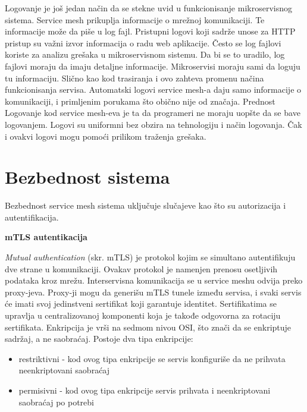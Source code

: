 \documentclass[a4paper,12pt]{report}
\begin{document}
Logovanje je još jedan način da se stekne uvid u funkcionisanje mikroservisnog sistema. Service mesh prikuplja informacije o mrežnoj komunikaciji. Te informacije može da piše u log fajl. Pristupni logovi koji sadrže unose za HTTP pristup su važni izvor informacija o radu web aplikacije. Često se log fajlovi koriste za analizu grešaka u mikroservisnom sistemu. Da bi se to uradilo, log fajlovi moraju da imaju detaljne informacije. Mikroservisi moraju sami da loguju tu informaciju. Slično kao kod trasiranja i ovo zahteva promenu načina funkcionisanja servisa. Automatski logovi service mesh-a daju samo informacije o komunikaciji, i primljenim porukama što obično nije od značaja. Prednost Logovanje kod service mesh-eva je ta da programeri ne moraju uopšte da se bave logovanjem. Logovi su uniformni bez obzira na tehnologiju i način logovanja. Čak i ovakvi logovi mogu pomoći prilikom traženja grešaka. \newline
 
\section{Bezbednost sistema}

Bezbednost service mesh sistema uključuje slučajeve kao što su autorizacija i autentifikacija. \newline

\textbf{mTLS autentikacija}\newline

\textit{Mutual authentication} (skr. mTLS) je protokol kojim se simultano autentifikuju dve strane u komunikaciji. Ovakav protokol je namenjen prenosu osetljivih podataka kroz mrežu. Interservisna komunikacija se u service meshu odvija preko proxy-jeva. Proxy-ji mogu da generišu mTLS tunele između servisa, i svaki servis će imati svoj jedinstveni sertifikat koji garantuje identitet. Sertifikatima se upravlja u centralizovanoj komponenti koja je takođe odgovorna za rotaciju sertifikata. Enkripcija je vrši na sedmom nivou OSI, što znači da se enkriptuje sadržaj, a ne saobraćaj. 
Postoje dva tipa enkripcije: 

\begin{itemize}
	\item restriktivni - kod ovog tipa enkripcije se servis konfiguriše da ne prihvata neenkriptovani saobraćaj
	\item  permisivni - kod ovog tipa enkripcije servis prihvata i neenkriptovani saobraćaj po potrebi
\end{itemize}
\end{document}
